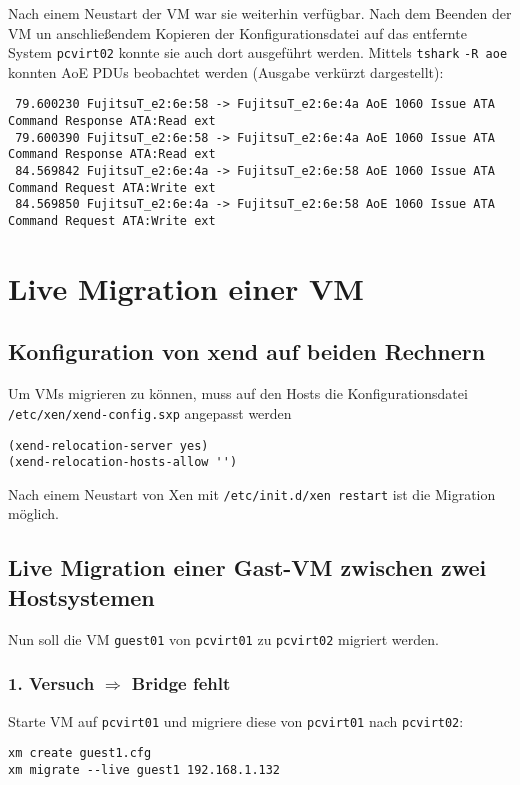 Nach einem Neustart der VM war sie weiterhin verfügbar. Nach dem Beenden der VM un anschließendem Kopieren der Konfigurationsdatei auf das entfernte System \verb#pcvirt02# konnte sie auch dort ausgeführt werden. Mittels \verb#tshark# \verb#-R aoe# konnten AoE PDUs beobachtet werden (Ausgabe verkürzt dargestellt):
\setupVerbatimOut
\begin{verbatim}
 79.600230 FujitsuT_e2:6e:58 -> FujitsuT_e2:6e:4a AoE 1060 Issue ATA Command Response ATA:Read ext
 79.600390 FujitsuT_e2:6e:58 -> FujitsuT_e2:6e:4a AoE 1060 Issue ATA Command Response ATA:Read ext
 84.569842 FujitsuT_e2:6e:4a -> FujitsuT_e2:6e:58 AoE 1060 Issue ATA Command Request ATA:Write ext
 84.569850 FujitsuT_e2:6e:4a -> FujitsuT_e2:6e:58 AoE 1060 Issue ATA Command Request ATA:Write ext
\end{verbatim}

\chapter{Live Migration einer VM}

\section{Konfiguration von xend auf beiden Rechnern}
Um VMs migrieren zu können, muss auf den Hosts die Konfigurationsdatei \verb#/etc/xen/xend-config.sxp# angepasst werden
\setupVerbatimOut
\begin{verbatim}
(xend-relocation-server yes)
(xend-relocation-hosts-allow '')
\end{verbatim} 
Nach einem Neustart von Xen mit \verb#/etc/init.d/xen restart# ist die Migration möglich. 

\section{Live Migration einer Gast-VM zwischen zwei Hostsystemen}
Nun soll die VM \verb#guest01# von \verb#pcvirt01# zu \verb#pcvirt02# migriert werden.


\subsection{1. Versuch $\Rightarrow$ Bridge fehlt}
Starte VM auf \verb#pcvirt01# und migriere diese von \verb#pcvirt01# nach \verb#pcvirt02#:
\setupVerbatimOut
\begin{verbatim}
xm create guest1.cfg
xm migrate --live guest1 192.168.1.132
\end{verbatim}

